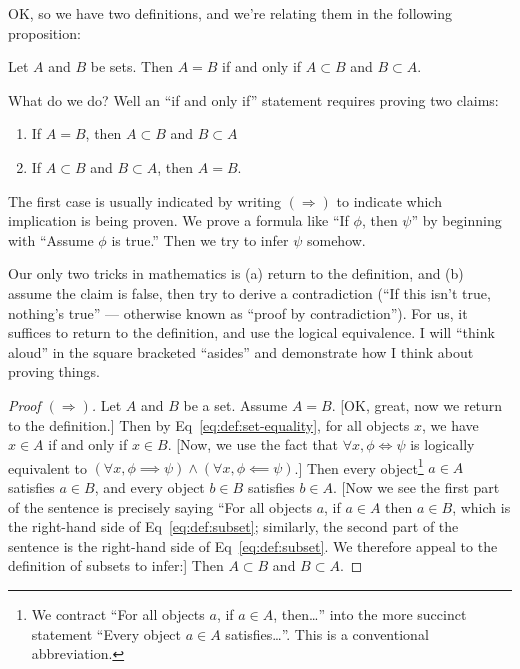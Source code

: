 OK, so we have two definitions, and we're relating them in the following
proposition:

\begin{proposition}
Let $A$ and $B$ be sets.
Then $A=B$ if and only if $A\subset B$ and $B\subset A$.
\end{proposition}

What do we do? Well an ``if and only if'' statement requires proving two
claims:
\begin{enumerate}
\item If $A=B$, then $A\subset B$ and $B\subset A$
\item If $A\subset B$ and $B\subset A$, then $A=B$.
\end{enumerate}
The first case is usually indicated by writing $(\Longrightarrow)$ to
indicate which implication is being proven. We prove a formula like ``If
$\phi$, then $\psi$'' by beginning with ``Assume $\phi$ is true.'' Then
we try to infer $\psi$ somehow.

Our only two tricks in mathematics is (a) return to the definition, and
(b) assume the claim is false, then try to derive a contradiction (``If
this isn't true, nothing's true'' --- otherwise known as ``proof by
contradiction''). For us, it suffices to return to the definition, and
use the logical equivalence. I will ``think aloud'' in the square
bracketed ``asides'' and demonstrate how I think about proving things.

\begin{proof}[Proof $(\Longrightarrow)$]
Let $A$ and $B$ be a set. Assume $A=B$. [OK, great, now we return to the
definition.] Then by Eq~\eqref{eq:def:set-equality}, for all objects
$x$, we have $x\in A$ if and only if $x\in B$. [Now, we use the fact
that $\forall x,\phi\iff\psi$ is logically equivalent to
$(\forall x,\phi\implies\psi)\land(\forall x,\phi\impliedby\psi)$.]
Then every object\footnote{We contract ``For all objects $a$, if $a\in A$, then\dots''
into the more succinct statement ``Every object $a\in A$ satisfies\dots''.
This is a conventional abbreviation.}
$a\in A$ satisfies $a\in B$, and every object $b\in B$
satisfies $b\in A$. [Now we see the first part of the sentence is
  precisely saying ``For all objects $a$, if $a\in A$ then $a\in B$, 
which is the right-hand side of Eq~\eqref{eq:def:subset}; similarly, the
second part of the sentence is the right-hand side of
Eq~\eqref{eq:def:subset}. We therefore appeal to the definition of
subsets to infer:]
Then $A\subset B$ and $B\subset A$.
\end{proof}

